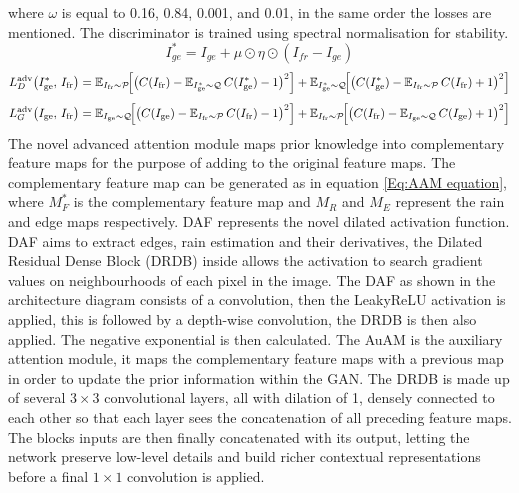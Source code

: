 \documentclass[11pt]{ociamthesis}  %
\begin{document}
where $\omega$ is equal to 0.16, 0.84, 0.001, and 0.01, in the same order the losses are mentioned. The discriminator is trained using spectral normalisation for stability\cite{miyato2018spectral}.
\noindent
\begin{equation}
I^*_{ge} = I_{ge} + \mu \odot \eta \odot (I_{fr} - I_{ge})
    \label{Eq:Advanced fake image}
\end{equation}
\noindent
\begin{equation}
L_{D}^{\mathrm{adv}}\bigl(I_{\mathrm{ge}}^*,\,I_{\mathrm{fr}}\bigr)
= \mathbb{E}_{I_{\mathrm{fr}}\sim\mathcal{P}}\!\Bigl[\bigl(C(I_{\mathrm{fr}})
   - \mathbb{E}_{I_{\mathrm{ge}}^*\sim\mathcal{Q}}\,C(I_{\mathrm{ge}}^*)
   - 1\bigr)^{2}\Bigr]
+ \mathbb{E}_{I_{\mathrm{ge}}^*\sim\mathcal{Q}}\!\Bigl[\bigl(C(I_{\mathrm{ge}}^*)
   - \mathbb{E}_{I_{\mathrm{fr}}\sim\mathcal{P}}\,C(I_{\mathrm{fr}})
   + 1\bigr)^{2}\Bigr]
   \label{Eq:Disc adversarial loss}
\end{equation}
\noindent
\begin{equation}
L_{G}^{\mathrm{adv}}\bigl(I_{\mathrm{ge}},\,I_{\mathrm{fr}}\bigr)
= \mathbb{E}_{I_{\mathrm{ge}}\sim\mathcal{Q}}\!\Bigl[\bigl(C(I_{\mathrm{ge}})
   - \mathbb{E}_{I_{\mathrm{fr}}\sim\mathcal{P}}\,C(I_{\mathrm{fr}})
   - 1\bigr)^{2}\Bigr]
+ \mathbb{E}_{I_{\mathrm{fr}}\sim\mathcal{P}}\!\Bigl[\bigl(C(I_{\mathrm{fr}})
   - \mathbb{E}_{I_{\mathrm{ge}}\sim\mathcal{Q}}\,C(I_{\mathrm{ge}})
   + 1\bigr)^{2}\Bigr]
   \label{Eq:Gen adversarial loss}
\end{equation}
\noindent
The novel advanced attention module maps prior knowledge into complementary feature maps for the purpose of adding to the original feature maps. The complementary feature map can be generated as in equation \ref{Eq:AAM equation}, where $M^*_F$ is the complementary feature map and $M_R$ and $M_E$ represent the rain and edge maps respectively. DAF represents the novel dilated activation function. DAF aims to extract edges, rain estimation and their derivatives, the Dilated Residual Dense Block (DRDB) inside allows the activation to search gradient values on neighbourhoods of each pixel in the image. The DAF as shown in the architecture diagram consists of a convolution, then the LeakyReLU activation is applied, this is followed by a depth-wise convolution, the DRDB is then also applied. The negative exponential is then calculated. The AuAM is the auxiliary attention module, it maps the complementary feature maps with a previous map in order to update the prior information within the GAN. The DRDB is made up of several $3 \times 3$ convolutional layers, all with dilation of 1, densely connected to each other so that each layer sees the concatenation of all preceding feature maps. The blocks inputs are then finally concatenated with its output, letting the network preserve low-level details and build richer contextual representations before a final $1 \times 1$ convolution is applied.
\end{document}
